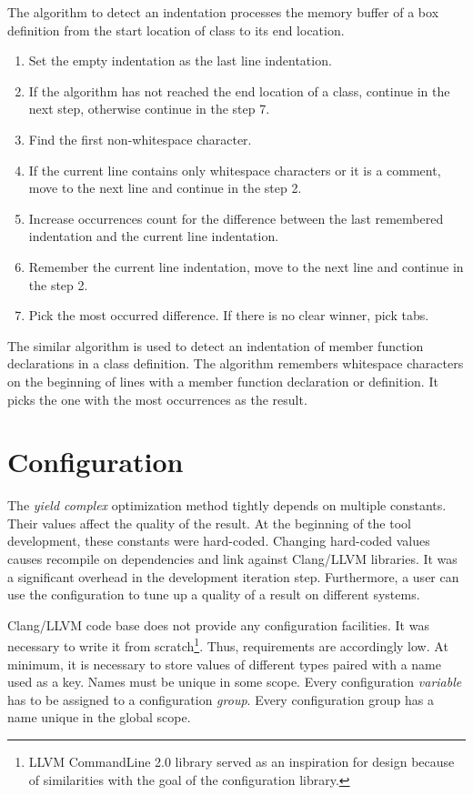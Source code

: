 The algorithm to detect an indentation processes the memory buffer of a box definition from the start location of class to its end location.

\begin{enumerate}
\item{Set the empty indentation as the last line indentation.}
\item{If the algorithm has not reached the end location of a class, continue in the next step, otherwise continue in the step 7.}
\item{Find the first non-whitespace character.}
\item{If the current line contains only whitespace characters or it is a comment, move to the next line and continue in the step 2.}
\item{Increase occurrences count for the difference between the last remembered indentation and the current line indentation.}
\item{Remember the current line indentation, move to the next line and continue in the step 2.}
\item{Pick the most occurred difference. If there is no clear winner, pick tabs.}
\end{enumerate}

The similar algorithm is used to detect an indentation of member function declarations in a class definition. The algorithm remembers whitespace characters on the beginning of lines with a member function declaration or definition. It picks the one with the most occurrences as the result.

\section{Configuration}
\label{opt-configuration}
The \emph{yield complex} optimization method tightly depends on multiple constants. Their values affect the quality of the result. At the beginning of the tool development, these constants were hard-coded. Changing hard-coded values causes recompile on dependencies and link against Clang/LLVM libraries. It was a significant overhead in the development iteration step. Furthermore, a user can use the configuration to tune up a quality of a result on different systems.

Clang/LLVM code base does not provide any configuration facilities. It was necessary to write it from scratch\footnote{LLVM CommandLine 2.0 library served as an inspiration for design because of similarities with the goal of the configuration library.}. Thus, requirements are accordingly low. At minimum, it is necessary to store values of different types paired with a name used as a key. Names must be unique in some scope. Every configuration \emph{variable} has to be assigned to a configuration \emph{group}. Every configuration group has a name unique in the global scope.

